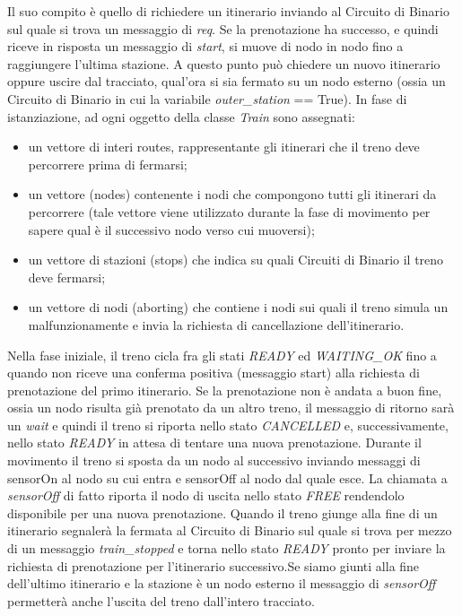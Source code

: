 Il suo compito è quello di richiedere un itinerario inviando al Circuito di
Binario sul quale si trova un messaggio di \textit{req}. Se la prenotazione ha
successo, e quindi riceve in risposta un messaggio di \textit{start}, si muove
di nodo in nodo fino a raggiungere l’ultima stazione. A questo punto può
chiedere un nuovo itinerario oppure uscire dal tracciato, qual’ora si sia
fermato su un nodo esterno (ossia un Circuito di Binario in cui la variabile
\textit{outer\_station} == True).
In fase di istanziazione, ad ogni oggetto della classe \textit{Train} sono
assegnati:
\begin{itemize}
  \item un vettore di interi routes, rappresentante gli itinerari che il treno
  deve percorrere prima di fermarsi; 
  \item un vettore (nodes) contenente i nodi che compongono tutti gli
  itinerari da percorrere (tale vettore viene utilizzato durante la fase di
  movimento per sapere qual è il successivo nodo verso cui muoversi);
  \item un vettore di stazioni (stops) che indica su quali Circuiti di Binario
  il treno deve fermarsi;
  \item un vettore di nodi (aborting) che contiene i nodi sui quali il treno
  simula un malfunzionamente e invia la richiesta di cancellazione dell’itinerario.
\end{itemize}
Nella fase iniziale, il treno cicla fra gli stati \textit{READY} ed
\textit{WAITING\_OK} fino a quando non riceve una conferma positiva (messaggio
start) alla richiesta di prenotazione del primo itinerario. Se la prenotazione
non è andata a buon fine, ossia un nodo risulta già prenotato da un altro treno,
il messaggio di ritorno sarà un \textit{wait} e quindi il treno si riporta nello
stato \textit{CANCELLED} e, successivamente, nello stato \textit{READY} in attesa di tentare una nuova prenotazione.
Durante il movimento il treno si sposta da un nodo al successivo inviando messaggi
di sensorOn al nodo su cui entra e sensorOff al nodo dal quale esce. La chiamata
a \textit{sensorOff} di fatto riporta il nodo di uscita nello stato
\textit{FREE} rendendolo disponibile per una nuova prenotazione.
Quando il treno giunge alla fine di un itinerario segnalerà la fermata al
Circuito di Binario sul quale si trova per mezzo di un messaggio
\textit{train\_stopped} e torna nello stato \textit{READY} pronto per inviare la
richiesta di prenotazione per l’itinerario successivo.Se siamo giunti alla fine
dell’ultimo itinerario e la stazione è un nodo esterno il messaggio 
di \textit{sensorOff} permetterà anche l’uscita del treno dall’intero tracciato.

